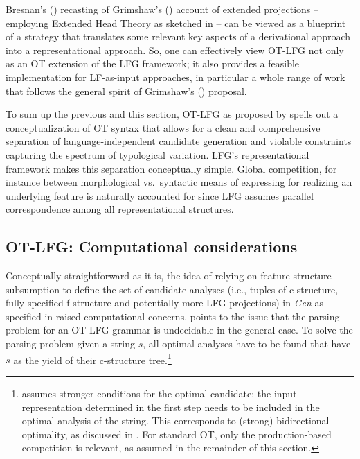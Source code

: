 \documentclass[output=paper,hidelinks]{langscibook}
\begin{document}
Bresnan's (\citeyear{Bresnan-96-LFG-conference}) recasting of Grimshaw's (\citeyear{Grimshaw97}) account of extended projections -- employing Extended Head Theory as sketched in  -- can be viewed as a blueprint of a strategy that translates some relevant key aspects of a derivational approach into a representational approach. So, one can effectively view OT-LFG not only as an OT extension of the LFG framework; it also provides a feasible implementation for LF-as-input approaches, in particular a whole range of work that follows the general spirit of Grimshaw's (\citeyear{Grimshaw97}) proposal. %

To sum up the previous and this section, OT-LFG as proposed by \citet{Bresnan-96-LFG-conference,bresnan00opt,Bresnan-Explaining-Morphosyntactic,Bresnan-Lexicon-in-OT} spells out a conceptualization of OT syntax that allows for a clean and comprehensive separation of language-independent candidate generation and violable constraints capturing the spectrum of typological variation. LFG's representational framework makes this separation conceptually simple. Global competition, for instance between morphological vs.\ syntactic means of expressing for realizing an underlying feature is naturally accounted for since LFG assumes parallel correspondence among all representational structures. 


\subsection{OT-LFG: Computational considerations}
\label{sec:OT:comp-considerations}

Conceptually straightforward as it is, the idea of relying on feature structure subsumption to define the set of candidate analyses (i.e., tuples of c-structure, fully specified f-structure and potentially more LFG projections) in \emph{Gen} as specified in  raised computational concerns. \citet{Johnson98} points to the issue that the parsing problem for an OT-LFG grammar is undecidable in the general case. To solve the parsing problem given a string $s$, all optimal analyses have to be found that have $s$ as the yield of their c-structure tree.\footnote{\citet{Johnson98} assumes stronger conditions for the optimal candidate: the input representation determined in the first step needs to be included in the optimal analysis of the string. This corresponds to (strong) bidirectional optimality, as discussed in . For standard OT, only the production-based competition is relevant, as assumed in the remainder of this section.} %
\end{document}
